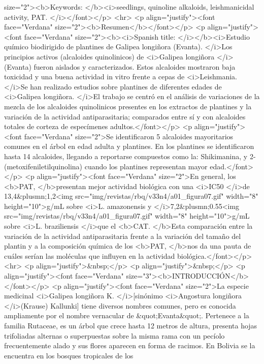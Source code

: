 size="2"><b>Keywords: </b><i>seedlings, quinoline alkaloids, leishmanicidal
activity, PAT. </i></font></p> <hr> <p align="justify"><font face="Verdana"
size="2"><b>Resumen</b></font></p> <p align="justify"><font face="Verdana"
size="2"><b><i>Spanish title: </i></b><i>Estudio químico biodirigido de
plantines de Galipea longiñora (Evanta). </i>Los principios activos (alcaloides
quinolinicos) de <i>Galipea longiñora </i>(Evanta) fueron aislados y
caracterizados. Estos alcaloides mostraron baja toxicidad y una buena actividad
in vitro frente a cepas de <i>Leishmania. </i>Se han realizado estudios sobre
plantines de diferentes edades de <i>Galipea longiñora. </i>El trabajo se centró
en el análisis de variaciones de la mezcla de los alcaloides quinolinicos
presentes en los extractos de plantines y la variación de la actividad
antiparasitaria; comparados entre sí y con alcaloides totales de corteza de
especímenes adultos.</font></p> <p align="justify"><font face="Verdana"
size="2">Se identificaron 5 alcaloides mayoritarios comunes en el árbol en edad
adulta y plantines. En los plantines se identificaron hasta 14 alcaloides,
llegando a reportarse compuestos como la: Shikimanina, y
2-(metoxifeniletilquinolina) cuando los plantines representan mayor
edad.</font></p> <p align="justify"><font face="Verdana" size="2">En general,
los <b>PAT, </b>presentan mejor actividad biológica con una <i>IC50 </i>de
13,4\&plusmn;1,2<img src="img/revistas/rbq/v33n4/a01\_{}figura07.gif" width="8"
height="10">g/mL sobre <i>L. amazonensis y </i>7,2\&plusmn;0.55<img
src="img/revistas/rbq/v33n4/a01\_{}figura07.gif" width="8" height="10">g/mL
sobre <i>L. braziliensis </i>que el <b>CAT. </b>Esta comparación entre la
variación de la actividad antiparasitaria frente a la variación del tamaño del
plantin y a la composición química de los <b>PAT, </b>nos da una pauta de cuáles
serían las moléculas que influyen en la actividad biológica.</font></p> <hr> <p
align="justify">\&nbsp;</p> <p align="justify">\&nbsp;</p> <p
align="justify"><font face="Verdana" size="3"><b>INTRODUCCIÓN</b></font></p> <p
align="justify"><font face="Verdana" size="2">La especie medicinal <i>Galipea
longiñora K. </i>[sinónimo <i>Angostura longiñora </i>(Krause) Kallunki] tiene
diversos nombres comunes, pero es conocida ampliamente por el nombre vernacular
de \&quot;Evanta\&quot;. Pertenece a la familia Rutaceae, es un árbol que crece
hasta 12 metros de altura, presenta hojas trifoliadas alternas o superpuestas
sobre la misma rama con un pecíolo frecuentemente alado y sus flores aparecen en
forma de racimos. En Bolivia se la encuentra en los bosques tropicales de los
